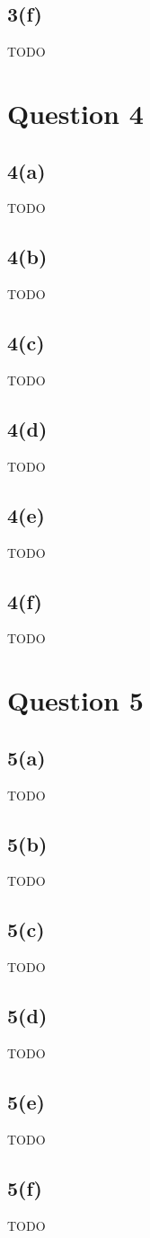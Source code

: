 \documentclass[10pt, a4paper,reqno]{article}
\begin{document}
\subsection*{3(f)}
TODO


%
%
\section*{Question 4}

\subsection*{4(a)}
TODO

\subsection*{4(b)}
TODO

\subsection*{4(c)}
TODO

\subsection*{4(d)}
TODO

\subsection*{4(e)}
TODO

\subsection*{4(f)}
TODO


%
%
\section*{Question 5}

\subsection*{5(a)}
TODO

\subsection*{5(b)}
TODO

\subsection*{5(c)}
TODO

\subsection*{5(d)}
TODO

\subsection*{5(e)}
TODO

\subsection*{5(f)}
TODO
\end{document}
